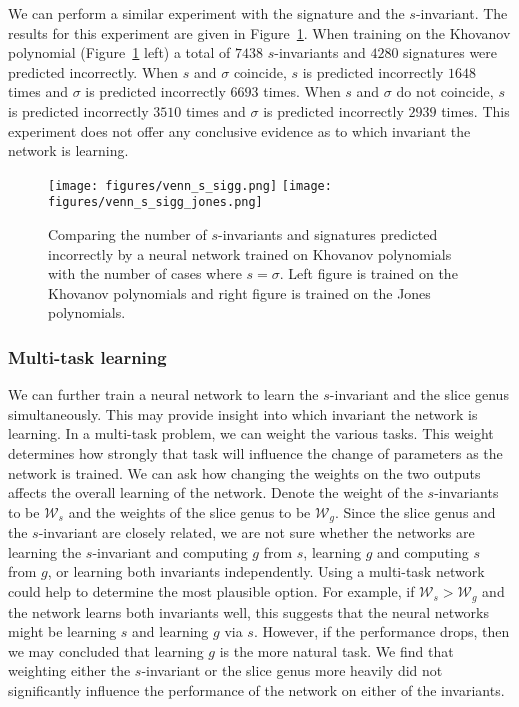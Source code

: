 \documentclass[11pt]{article}
\numberwithin{equation}{section}
\begin{document}
We can perform a similar experiment with the signature and the $s$-invariant. The results for this experiment are given in Figure~\ref{fig:venn_sig_s}. When training on the Khovanov polynomial (Figure~\ref{fig:venn_sig_s} left) a total of $7438$ $s$-invariants and $4280$ signatures were predicted incorrectly. When $s$ and $\sigma$ coincide, $s$ is predicted incorrectly $1648$ times and $\sigma$ is predicted incorrectly $6693$ times. When $s$ and $\sigma$ do not coincide, $s$ is predicted incorrectly $3510$ times and $\sigma$ is predicted incorrectly $2939$ times. This experiment does not offer any conclusive evidence as to which invariant the network is learning.
\begin{figure}
    \centering
    \texttt{[image: figures/venn\_s\_sigg.png]}
    \texttt{[image: figures/venn\_s\_sigg\_jones.png]}
    \caption{\small{Comparing the number of $s$-invariants and signatures predicted incorrectly by a neural network trained on Khovanov polynomials with the number of cases where $s = \sigma$. Left figure is trained on the Khovanov polynomials and right figure is trained on the Jones polynomials.}}
    \label{fig:venn_sig_s}
\end{figure}

\subsubsection{Multi-task learning}
We can further train a neural network to learn the $s$-invariant and the slice genus simultaneously.
This may provide insight into which invariant the network is learning.
In a multi-task problem, we can weight the various tasks.
This weight determines how strongly that task will influence the change of parameters as the network is trained. 
We can ask how changing the weights on the two outputs affects the overall learning of the network.
Denote the weight of the $s$-invariants to be $\mathcal{W}_s$ and the weights of the slice genus to be $\mathcal{W}_g$. Since the slice genus and the $s$-invariant are closely related, we are not sure whether the networks are learning the $s$-invariant and computing $g$ from $s$, learning $g$ and computing $s$ from $g$, or learning both invariants independently. Using a multi-task network could help to determine the most plausible option. For example, if $\mathcal{W}_s > \mathcal{W}_g$ and the network learns both invariants well, this suggests that the neural networks might be learning $s$ and learning $g$ via $s$. However, if the performance drops, then we may concluded that learning $g$ is the more natural task.
We find that weighting either the $s$-invariant or the slice genus more heavily did not significantly influence the performance of the network on either of the invariants.
\end{document}
